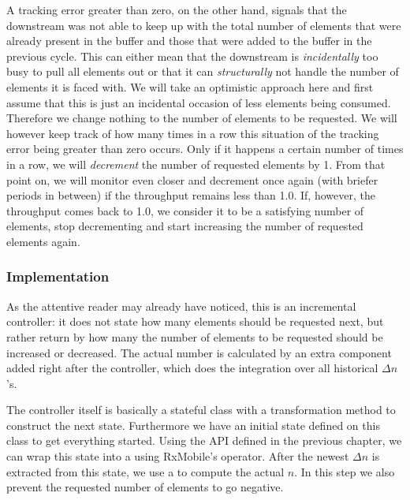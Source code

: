 A tracking error greater than zero, on the other hand, signals that the downstream was not able to keep up with the total number of elements that were already present in the buffer and those that were added to the buffer in the previous cycle. This can either mean that the downstream is \emph{incidentally} too busy to pull all elements out or that it can \emph{structurally} not handle the number of elements it is faced with. We will take an optimistic approach here and first assume that this is just an incidental occasion of less elements being consumed. Therefore we change nothing to the number of elements to be requested. We will however keep track of how many times in a row this situation of the tracking error being greater than zero occurs. Only if it happens a certain number of times in a row, we will \textit{decrement} the number of requested elements by 1. From that point on, we will monitor even closer and decrement once again (with briefer periods in between) if the throughput remains less than 1.0. If, however, the throughput comes back to 1.0, we consider it to be a satisfying number of elements, stop decrementing and start increasing the number of requested elements again.

\subsubsection*{Implementation}
As the attentive reader may already have noticed, this is an incremental controller: it does not state how many elements should be requested next, but rather return by how many the number of elements to be requested should be increased or decreased. The actual number is calculated by an extra component added right after the controller, which does the integration over all historical $\Delta n$'s.

The controller itself is basically a stateful class with a transformation method to construct the next state. Furthermore we have an initial state defined on this class to get everything started. Using the API defined in the previous chapter, we can wrap this state into a  using RxMobile's  operator. After the newest $\Delta n$ is extracted from this state, we use a  to compute the actual $n$. In this step we also prevent the requested number of elements to go negative.

